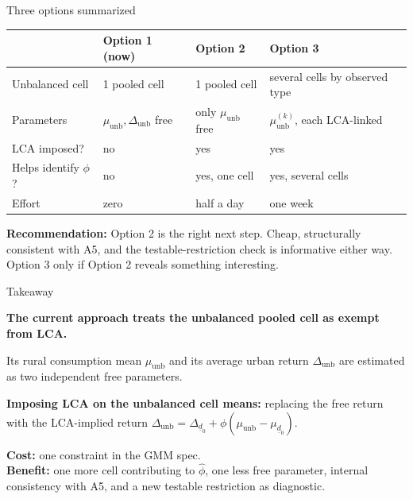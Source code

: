 \documentclass[10pt,aspectratio=169]{beamer}
\newcommand{\mudz}{\mu_{\underline{d}_0}}
\newcommand{\munb}{\mu_{\mathrm{unb}}}
\newcommand{\Deltadz}{\Delta_{\underline{d}_0}}
\newcommand{\Deltaunb}{\Delta_{\mathrm{unb}}}
\begin{document}
\begin{frame}{Three options summarized}

  \begin{center}
  \footnotesize
  \begin{tabular}{p{2.9cm}p{3.1cm}p{3.1cm}p{3.3cm}}
    \toprule
     & \textbf{Option 1 (now)} & \textbf{Option 2} & \textbf{Option 3} \\
    \midrule
    Unbalanced cell & 1 pooled cell & 1 pooled cell & several cells by observed type \\[0.2em]
    Parameters & $\munb,\Deltaunb$ free & only $\munb$ free & $\munb^{(k)}$, each LCA-linked \\[0.2em]
    LCA imposed? & no & yes & yes \\[0.2em]
    Helps identify $\phi$? & no & yes, one cell & yes, several cells \\[0.2em]
    Effort & zero & half a day & one week \\
    \bottomrule
  \end{tabular}
  \end{center}

  \vspace{0.7em}
  \textbf{Recommendation:} Option 2 is the right next step. Cheap, structurally consistent with A5, and the testable-restriction check is informative either way. Option 3 only if Option 2 reveals something interesting.

\end{frame}

\begin{frame}{Takeaway}

  \begin{center}
    \begin{minipage}{0.9\textwidth}

    \textbf{The current approach treats the unbalanced pooled cell as exempt from LCA.}

    \vspace{0.8em}
    Its rural consumption mean $\munb$ and its average urban return $\Deltaunb$ are estimated as two independent free parameters.

    \vspace{0.8em}
    \textbf{Imposing LCA on the unbalanced cell means:} replacing the free return with the LCA-implied return $\Deltaunb = \Deltadz + \phi(\munb - \mudz)$.

    \vspace{0.8em}
    \textbf{Cost:} one constraint in the GMM spec.\\
    \textbf{Benefit:} one more cell contributing to $\hat\phi$, one less free parameter, internal consistency with A5, and a new testable restriction as diagnostic.

    \end{minipage}
  \end{center}

\end{frame}
\end{document}
